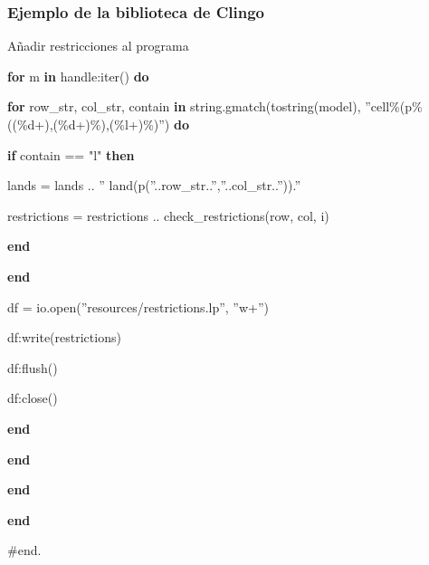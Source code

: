 \documentclass[10pt]{beamer}
\begin{document}
	\begin{frame}
	\frametitle{Ejemplo de la biblioteca de Clingo}
	
	\begin{block}{Añadir restricciones al programa}
	\ttfamily \footnotesize
	
	\hspace{6em} \textbf{for} m \textbf{in} handle:iter() \textbf{do}
	
	\hspace{8em} \textbf{for} row\_str, col\_str, contain \textbf{in} string.gmatch(tostring(model), 	''cell\%(p\%((\%d+),(\%d+)\%),(\%l+)\%)'') \textbf{do}
	
	\hspace{10em} \textbf{if} contain == "l"  \textbf{then}
	
	\hspace{12em} lands = lands .. '' land(p(''..row\_str..'',''..col\_str..'')).''
	
	\hspace{12em} restrictions = restrictions .. check\_restrictions(row, col, i)
	
	\hspace{10em} \textbf{end}
	
	\hspace{8em} \textbf{end}
	
	\vspace{1em}
	
	\hspace{8em} df = io.open(''resources/restrictions.lp'', ''w+'')
	
	\hspace{8em} df:write(restrictions)
	
	\hspace{8em} df:flush()
	
	\hspace{8em} df:close()
	
	\hspace{6em} \textbf{end}
	
	\hspace{4em} \textbf{end}
	
	\hspace{2em} \textbf{end}
	
	\textbf{end}
	
	\#end.
	\end{block}
	\end{frame}
\end{document}
